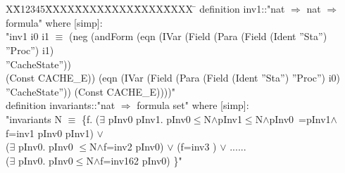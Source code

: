 \documentclass{llncs-new}
\newlength{\fminilength}
\newenvironment{fmini}[1][\linewidth]
  {\setlength{\fminilength}{#1\fboxsep-2\fboxrule}%
   \vspace{2ex}\noindent\begin{lrbox}{\fminibox}\begin{minipage}{\fminilength}%
   \mbox{ }\hfill\vspace{-2.5ex}}%
  {\end{minipage}\end{lrbox}\vspace{1ex}\hspace{0ex}%
   \framebox{\usebox{\fminibox}}}
\newenvironment{specification}
{\noindent\scriptsize
\tt\begin{fmini}\begin{tabbing}X\=X12345\=XXXX\=XXXX\=XXXX\=XXXX\=XXXX
\=\+\kill} {\end{tabbing}\normalfont\end{fmini}}
\def \pInv {i}
\begin{document}
\begin{specification}
definition inv1::"nat $\Rightarrow$ nat $\Rightarrow$ formula" where [simp]:\\
"inv1 \pInv0 \pInv1 $\equiv$
(neg (andForm (eqn (IVar (Field (Para (Field (Ident ''Sta'') ''Proc'') \pInv1)\\ ''CacheState''))\\
 (Const CACHE\_E)) (eqn (IVar (Field (Para (Field (Ident ''Sta'') ''Proc'') \pInv0)\\ ''CacheState'')) (Const CACHE\_E))))"\\
definition invariants::"nat $\Rightarrow$ formula set" where [simp]:\\
"invariants N $\equiv$ \{f.
($\exists$ pInv0 pInv1. pInv0$\le$N$\wedge$pInv1$\le$N$\wedge$pInv0~=pInv1$\wedge$f=inv1  pInv0 pInv1) $\vee$\\
($\exists$ pInv0. pInv0 $\le$N$\wedge$f=inv2  pInv0) $\vee$
(f=inv3  ) $\vee$ ......\\
($\exists$ pInv0. pInv0$\le$N$\wedge$f=inv162  pInv0) \}"
\end{specification}




\end{document}
